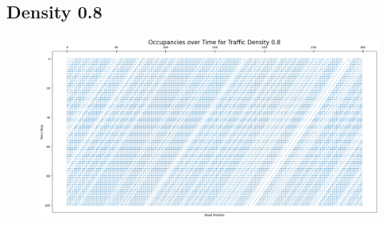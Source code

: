 \documentclass{article}
\begin{document}
\subsection{Density 0.8}
\begin{figure}[!h]
    \centering
    \includegraphics[width=0.75\linewidth]{assets/d0.8.png}
\end{figure}
\end{document}
